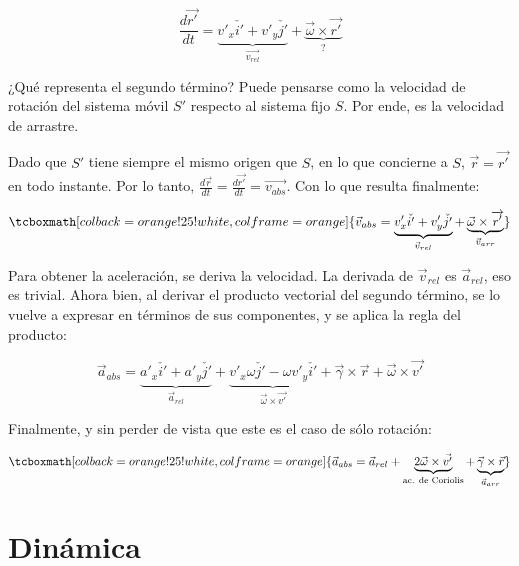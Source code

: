 \documentclass{article}
\begin{document}
\begin{equation}
\frac{d\overrightarrow{r'}}{dt} = \underbrace{ v'_x \check{i'} + v'_y \check{j'} }_{\overrightarrow{v_{rel}}} + \underbrace{ \overrightarrow{\omega} \times \overrightarrow{r'} }_{?}
\end{equation}

¿Qué representa el segundo término? Puede pensarse como la velocidad de rotación del sistema móvil $S'$ respecto al sistema fijo $S$. Por ende, es la velocidad de arrastre.

Dado que $S'$ tiene siempre el mismo origen que $S$, en lo que concierne a $S$, $\overrightarrow{r} = \overrightarrow{r'}$ en todo instante. Por lo tanto, $\frac{d\overrightarrow{r}}{dt} = \frac{d\overrightarrow{r'}}{dt} = \overrightarrow{v_{abs}}$. Con lo que resulta finalmente:

\begin{equation}
\tcboxmath[colback=orange!25!white,colframe=orange]{
\vec{v}_{abs} = \underbrace{ v'_x \check{i'} + v'_y \check{j'} }_{\vec{v}_{rel}} + \underbrace{ \vec{\omega} \times \overrightarrow{r'} }_{\vec{v}_{arr}}
}
\end{equation}

Para obtener la aceleración, se deriva la velocidad. La derivada de $\vec{v}_{rel}$ es $\vec{a}_{rel}$, eso es trivial. Ahora bien, al derivar el producto vectorial del segundo término, se lo vuelve a expresar en términos de sus componentes, y se aplica la regla del producto:

\begin{equation}
\vec{a}_{abs} = \underbrace{ a'_x \check{i'} + a'_y \check{j'} }_{\vec{a}_{rel}} + \underbrace{ v'_x \omega \check{j'} - \omega v'_y \check{i'} }_{\vec{\omega} \times \vec{v'}} + \vec{\gamma} \times \vec{r} + \vec{\omega} \times \vec{v'}
\end{equation}

Finalmente, y sin perder de vista que este es el caso de sólo rotación:

\begin{equation}
\tcboxmath[colback=orange!25!white,colframe=orange]{
\vec{a}_{abs} = \vec{a}_{rel} + \underbrace{2 \vec{\omega} \times \vec{v'} }_{\text{ac. de Coriolis}} + \underbrace{ \vec{\gamma} \times \vec{r} }_{\vec{a}_{arr}}
}
\end{equation}

\section{Dinámica}
\end{document}
